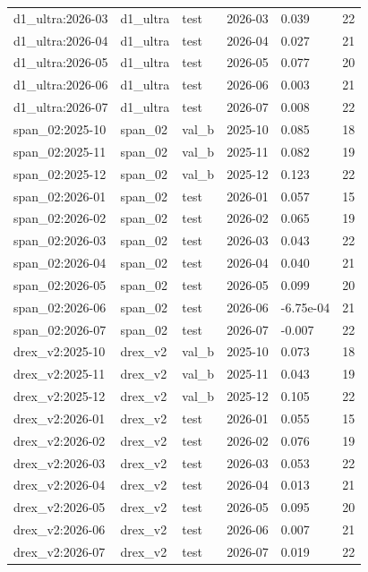 \begin{tabular}{llllll}
d1\_ultra:2026-03 & d1\_ultra & test & 2026-03 & 0.039 & 22 \\
d1\_ultra:2026-04 & d1\_ultra & test & 2026-04 & 0.027 & 21 \\
d1\_ultra:2026-05 & d1\_ultra & test & 2026-05 & 0.077 & 20 \\
d1\_ultra:2026-06 & d1\_ultra & test & 2026-06 & 0.003 & 21 \\
d1\_ultra:2026-07 & d1\_ultra & test & 2026-07 & 0.008 & 22 \\
span\_02:2025-10 & span\_02 & val\_b & 2025-10 & 0.085 & 18 \\
span\_02:2025-11 & span\_02 & val\_b & 2025-11 & 0.082 & 19 \\
span\_02:2025-12 & span\_02 & val\_b & 2025-12 & 0.123 & 22 \\
span\_02:2026-01 & span\_02 & test & 2026-01 & 0.057 & 15 \\
span\_02:2026-02 & span\_02 & test & 2026-02 & 0.065 & 19 \\
span\_02:2026-03 & span\_02 & test & 2026-03 & 0.043 & 22 \\
span\_02:2026-04 & span\_02 & test & 2026-04 & 0.040 & 21 \\
span\_02:2026-05 & span\_02 & test & 2026-05 & 0.099 & 20 \\
span\_02:2026-06 & span\_02 & test & 2026-06 & -6.75e-04 & 21 \\
span\_02:2026-07 & span\_02 & test & 2026-07 & -0.007 & 22 \\
drex\_v2:2025-10 & drex\_v2 & val\_b & 2025-10 & 0.073 & 18 \\
drex\_v2:2025-11 & drex\_v2 & val\_b & 2025-11 & 0.043 & 19 \\
drex\_v2:2025-12 & drex\_v2 & val\_b & 2025-12 & 0.105 & 22 \\
drex\_v2:2026-01 & drex\_v2 & test & 2026-01 & 0.055 & 15 \\
drex\_v2:2026-02 & drex\_v2 & test & 2026-02 & 0.076 & 19 \\
drex\_v2:2026-03 & drex\_v2 & test & 2026-03 & 0.053 & 22 \\
drex\_v2:2026-04 & drex\_v2 & test & 2026-04 & 0.013 & 21 \\
drex\_v2:2026-05 & drex\_v2 & test & 2026-05 & 0.095 & 20 \\
drex\_v2:2026-06 & drex\_v2 & test & 2026-06 & 0.007 & 21 \\
drex\_v2:2026-07 & drex\_v2 & test & 2026-07 & 0.019 & 22 \\
\bottomrule
\end{tabular}
